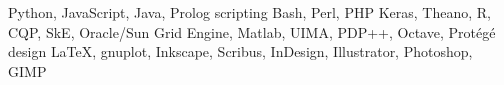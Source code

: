 
        {Python, JavaScript, Java, Prolog}
    {scripting}
        {Bash, Perl, PHP}
        {Keras, Theano, R, CQP, SkE, Oracle/Sun Grid Engine,
        Matlab, UIMA, PDP++, Octave, Prot\'{e}g\'{e}}
    {design}
        {\LaTeX, gnuplot, Inkscape, Scribus, InDesign, Illustrator, Photoshop, GIMP}

